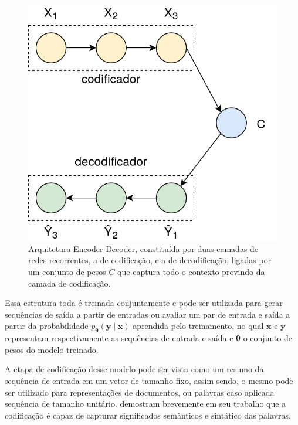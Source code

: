 \begin{figure}
\begin{center} {
    \begin{center}
    \includegraphics[scale=0.30]{images/encoder_decoder.png}
    \caption{Arquitetura Encoder-Decoder, constituída por duas camadas de redes
             recorrentes, a de codificação, e a de decodificação, ligadas por um
             conjunto de pesos $C$ que captura todo o contexto provindo da
             camada de codificação.}
    \label{fig:encoder_decoder}
    \end{center}
}
\end{center}
\end{figure}

Essa estrutura toda é treinada conjuntamente e pode ser utilizada para gerar
sequências de saída a partir de entradas ou avaliar um par de entrada e saída a
partir da probabilidade $p_{\mathbf{\theta}}(\mathbf{y} \mid \mathbf{x})$
aprendida pelo treinamento, no qual $\mathbf{x}$ e $\mathbf{y}$ representam
respectivamente as sequências de entrada e saída e $\mathbf{\theta}$ o conjunto
de pesos do modelo treinado.

A etapa de codificação desse modelo pode ser vista como um resumo da sequência
de entrada em um vetor de tamanho fixo, assim sendo, o mesmo pode ser utilizado
para representações de documentos, ou palavras caso aplicada sequência de
tamanho unitário.
\citet{cho14} demostram brevemente em seu trabalho que a codificação é capaz de
capturar significados semânticos e sintático das palavras.

